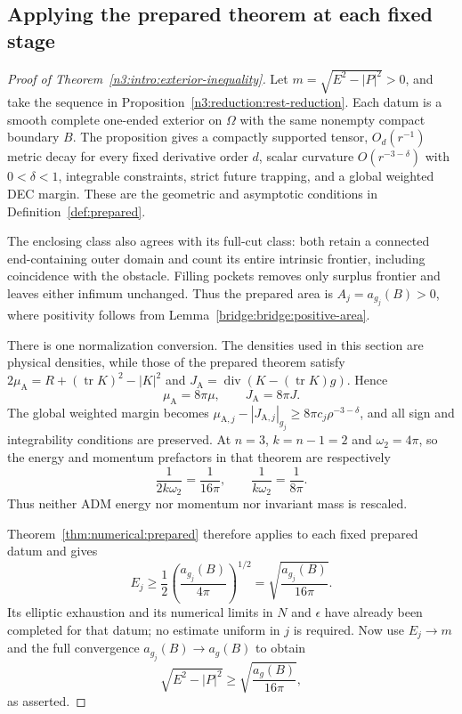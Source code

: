 \subsection{Applying the prepared theorem at each fixed stage}
\label{n3:reduction:prepared-transfer}

\begin{proof}[Proof of Theorem~\ref{n3:intro:exterior-inequality}]
Let $m=\sqrt{E^2-|P|^2}>0$, and take the sequence in
Proposition~\ref{n3:reduction:rest-reduction}. Each datum is a smooth
complete one-ended exterior on $\Omega$ with the same nonempty compact
boundary $B$. The proposition gives a compactly supported tensor,
$O_d(r^{-1})$ metric decay for every fixed derivative order $d$,
scalar curvature $O(r^{-3-\delta})$ with $0<\delta<1$, integrable
constraints, strict future trapping, and a global weighted DEC margin.
These are the geometric and asymptotic conditions in
Definition~\ref{def:prepared}.

The enclosing class also agrees with its full-cut class: both retain
a connected end-containing outer domain and count its entire intrinsic
frontier, including coincidence with the obstacle. Filling pockets
removes only surplus frontier and leaves either infimum unchanged.
Thus the prepared area is $A_j=a_{g_j}(B)>0$, where positivity follows
from Lemma~\ref{bridge:bridge:positive-area}.

There is one normalization conversion. The densities used in this section
are physical densities, while those of the prepared theorem satisfy
$2\mu_{\mathrm A}=R+(\operatorname{tr}K)^2-|K|^2$ and
$J_{\mathrm A}=\operatorname{div}(K-(\operatorname{tr}K)g)$. Hence
\[
 \mu_{\mathrm A}=8\pi\mu,\qquad J_{\mathrm A}=8\pi J.
\]
The global weighted margin becomes
$\mu_{\mathrm A,j}-|J_{\mathrm A,j}|_{g_j}
\ge8\pi c_j\rho^{-3-\delta}$, and all sign and integrability
conditions are preserved. At $n=3$, $k=n-1=2$ and $\omega_2=4\pi$,
so the energy and momentum prefactors in that theorem are respectively
\[
 \frac1{2k\omega_2}=\frac1{16\pi},\qquad
 \frac1{k\omega_2}=\frac1{8\pi}.
\]
Thus neither ADM energy nor momentum nor invariant mass is rescaled.

Theorem~\ref{thm:numerical:prepared} therefore applies to each fixed
prepared datum and gives
\[
 E_j\ge\frac12\left(\frac{a_{g_j}(B)}{4\pi}\right)^{1/2}
     =\sqrt{\frac{a_{g_j}(B)}{16\pi}}.
\]
Its elliptic exhaustion and its numerical limits in $N$ and $\epsilon$
have already been completed for that datum; no estimate uniform in
$j$ is required. Now use $E_j\to m$ and the full convergence
$a_{g_j}(B)\to a_g(B)$ to obtain
\[
 \sqrt{E^2-|P|^2}\ge\sqrt{\frac{a_g(B)}{16\pi}},
\]
as asserted.
\end{proof}


